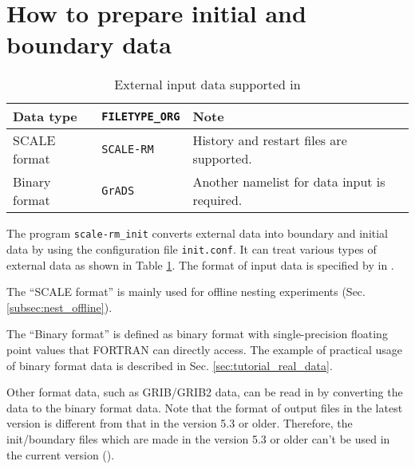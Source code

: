 \section{How to prepare initial and boundary data} \label{sec:adv_datainput}

\begin{table}[tbh]
\begin{center}
\caption{External input data supported in \scalelib}
\begin{tabularx}{150mm}{l|l|X} \hline
 \rowcolor[gray]{0.9} Data type   & \verb|FILETYPE_ORG|  & Note \\ \hline
 SCALE format   & \verb|SCALE-RM|     & History and restart files are supported. \\ \hline
 Binary format  & \verb|GrADS|        & Another namelist for data input is required.    \\ \hline
\end{tabularx}
\label{tab:inputdata_format}
\end{center}
\end{table}

The program \verb|scale-rm_init| converts external data into boundary and initial data by using the configuration file \verb|init.conf|.
It can treat various types of external data as shown in Table \ref{tab:inputdata_format}.
The format of input data is specified by  in .

The ``SCALE format'' is mainly used for offline nesting experiments (Sec. \ref{subsec:nest_offline}).

The ``Binary format'' is defined as binary format with single-precision floating point values that FORTRAN can directly access.
The example of practical usage of binary format data is described in Sec. \ref{sec:tutorial_real_data}.


Other format data, such as GRIB/GRIB2 data, can be read in \scale by converting the data to the binary format data.
Note that the format of output files in the latest version is different from that in the version 5.3 or older.
Therefore, the init/boundary files which are made in the version 5.3 or older can't be used in the current version (\scalelib \version).

